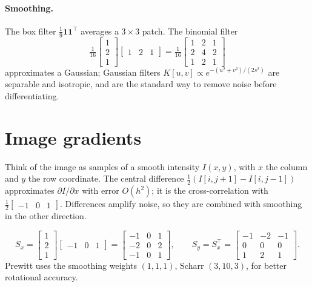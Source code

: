 \begin{notechapter}
\paragraph{Smoothing.} The box filter $\frac19\mathbf 1\mathbf 1^\top$ averages a $3\times3$ patch. The binomial filter
\[
  \tfrac1{16}\begin{bmatrix}1\\2\\1\end{bmatrix}\begin{bmatrix}1&2&1\end{bmatrix} = \tfrac1{16}\begin{bmatrix}1&2&1\\2&4&2\\1&2&1\end{bmatrix}
\]
approximates a Gaussian; Gaussian filters
$K[u,v]\propto e^{-(u^2 + v^2)/(2s^2)}$ are separable and isotropic, and are the standard way to remove noise before
differentiating.

\section{Image gradients}\label{convolution-filtering:sec:gradients}

Think of the image as samples of a smooth intensity $I(x,y)$, with $x$ the column and $y$ the row
coordinate. The central difference $\frac12(I[i,j + 1] - I[i,j - 1])$ approximates $\partial I/\partial x$ with error $O(h^2)$; it is the
cross-correlation with $\frac12\begin{bmatrix}-1 & 0 & 1\end{bmatrix}$. Differences amplify noise, so they are combined with
smoothing in the other direction.

\begin{definition}\label{convolution-filtering:def:sobel}
\[
  S_x = \begin{bmatrix}1\\2\\1\end{bmatrix}\begin{bmatrix}-1 & 0 & 1\end{bmatrix} = \begin{bmatrix}-1 & 0 & 1\\-2 & 0 & 2\\-1 & 0 & 1\end{bmatrix},\qquad
  S_y = S_x^\top = \begin{bmatrix}-1 & -2 & -1\\0 & 0 & 0\\1 & 2 & 1\end{bmatrix} .
\]
Prewitt uses the smoothing weights $(1,1,1)$, Scharr $(3,10,3)$, for better rotational accuracy.
\end{definition}


\end{notechapter}
